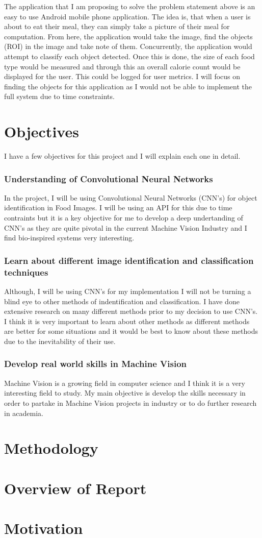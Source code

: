 The application that I am proposing to solve the problem statement above is an easy to use Android mobile phone application.
The idea is, that when a user is about to eat their meal, they can simply take a picture of their meal for computation.
From here, the application would take the image, find the objects (ROI) in the image and take note of them.
Concurrently, the application would attempt to classify each object detected.
Once this is done, the size of each food type would be measured and through this an overall calorie count would be displayed for the user.
This could be logged for user metrics. 
I will focus on finding the objects for this application as I would not be able to implement the full system due to time constraints.

\section{Objectives}
I have a few objectives for this project and I will explain each one in detail.
\subsubsection{Understanding of Convolutional Neural Networks}
In the project, I will be using Convolutional Neural Networks (CNN's) for object identification in Food Images.
I will be using an API for this due to time contraints but it is a key objective for me to develop a deep undertanding of CNN's as they are quite pivotal in the current Machine Vision Industry and I find bio-inspired systems very interesting.

\subsubsection{Learn about different image identification and classification techniques}
Although, I will be using CNN's for my implementation I will not be turning a blind eye to other methods of indentification and classification.
I have done extensive research on many different methods prior to my decision to use CNN's.
I think it is very important to learn about other methods as different methods are better for some situations and it would be best to know about these methods due to the inevitability of their use.

\subsubsection{Develop real world skills in Machine Vision}
Machine Vision is a growing field in computer science and I think it is a very interesting field to study.
My main objective is develop the skills necessary in order to partake in Machine Vision projects in industry or to do further research in academia.

\section{Methodology}

\section{Overview of Report}

\section{Motivation}